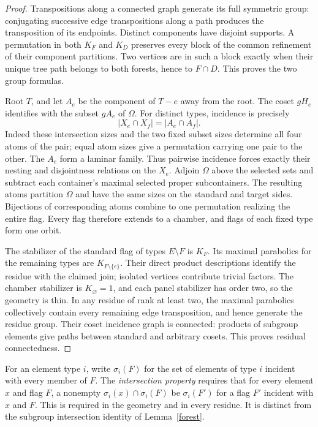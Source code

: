 \begin{proof}
Transpositions along a connected graph generate its full symmetric group:
conjugating successive edge transpositions along a path produces the
transposition of its endpoints. Distinct components have disjoint
supports. A permutation in both $K_F$ and $K_D$ preserves every block of
the common refinement of their component partitions. Two vertices are
in such a block exactly when their unique tree path belongs to both
forests, hence to $F\cap D$. This proves the two group formulas.

Root $T$, and let $A_e$ be the component of $T-e$ away from the root.
The coset $gH_e$ identifies with the subset $gA_e$ of $\Omega$.
For distinct types, incidence is precisely
\[
 |X_e\cap X_f|=|A_e\cap A_f|.
\]
Indeed these intersection sizes and the two fixed subset sizes determine
all four atoms of the pair; equal atom sizes give a permutation carrying
one pair to the other. The $A_e$ form a laminar family. Thus pairwise
incidence forces exactly their nesting and disjointness relations on the
$X_e$. Adjoin $\Omega$ above the selected sets and subtract each
container's maximal selected proper subcontainers. The resulting atoms
partition $\Omega$ and have the same sizes on the standard and target
sides. Bijections of corresponding atoms combine to one permutation
realizing the entire flag. Every flag therefore extends to a chamber,
and flags of each fixed type form one orbit.

The stabilizer of the standard flag of types $E\setminus F$ is $K_F$.
Its maximal parabolics for the remaining types are $K_{F\setminus\{e\}}$.
Their direct product descriptions identify the residue with the claimed
join; isolated vertices contribute trivial factors. The chamber
stabilizer is $K_\varnothing=1$, and each panel stabilizer has order two,
so the geometry is thin. In any residue of rank at least two, the
maximal parabolics collectively contain every remaining edge
transposition, and hence generate the residue group. Their coset
incidence graph is connected: products of subgroup elements give paths
between standard and arbitrary cosets. This proves residual connectedness.
\end{proof}

For an element type $i$, write $\sigma_i(F)$ for the set of elements of
type $i$ incident with every member of $F$. The \emph{intersection
property} requires that for every element $x$ and flag $F$, a nonempty
$\sigma_i(x)\cap\sigma_i(F)$ be $\sigma_i(F')$ for a flag $F'$ incident
with $x$ and $F$. This is required in the geometry and in every residue.
It is distinct from the subgroup intersection identity of Lemma~\ref{forest}.

